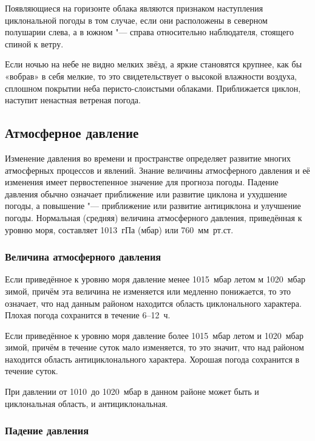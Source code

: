  Появляющиеся на горизонте облака являются признаком наступления
циклональной погоды в том случае, если они расположены в северном
полушарии слева, а в южном "--- справа относительно наблюдателя, стоящего
спиной к ветру.

 Если ночью на небе не видно мелких звёзд, а яркие становятся
крупнее, как бы «вобрав» в себя мелкие, то это свидетельствует о
высокой влажности воздуха, сплошном покрытии неба перисто-слоистыми
облаками. Приближается циклон, наступит ненастная ветреная погода.

\subsection{Атмосферное давление}

Изменение давления во времени и пространстве определяет развитие
многих атмосферных процессов и явлений. Знание величины атмосферного
давления и её изменения имеет первостепенное значение для прогноза
погоды. Падение давления обычно означает приближение или развитие
циклона и ухудшение погоды, а повышение "--- приближение или развитие
антициклона и улучшение погоды. Нормальная (средняя) величина
атмосферного давления, приведённая к уровню моря, составляет 1013~гПа
(мбар) или 760~мм~рт.ст.

\subsubsection{Величина атмосферного давления}

 Если приведённое к уровню моря давление менее 1015~мбар летом
м 1020~мбар зимой, причём эта величина не изменяется или медленно
понижается, то это означает, что над данным районом находится область
циклонального характера. Плохая погода сохранится в течение 6--12~ч.

 Если приведённое к уровню моря давление более 1015~мбар летом
и 1020~мбар зимой, причём в течение суток мало изменяется, то это
значит, что над районом находится область антициклонального
характера. Хорошая погода сохранится в течение суток.

 При давлении от 1010~до 1020~мбар в данном районе может быть и
циклональная область, и антициклональная.

\subsubsection{Падение давления}

